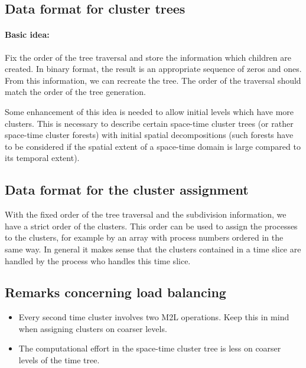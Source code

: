 \documentclass[a4paper,11pt]{article}
\theoremstyle{plain}
\theoremstyle{definition}
\theoremstyle{remark}
\begin{document}
\subsection{Data format for cluster trees}
\paragraph{Basic idea:} Fix the order of the tree traversal and store the information which children are created. In binary format, the result is an appropriate sequence of zeros and ones. From this information, we can recreate the tree. The order of the traversal should match the order of the tree generation.
  
Some enhancement of this idea is needed to allow initial levels which have more clusters. This is necessary to describe certain space-time cluster trees (or rather space-time cluster forests) with initial spatial decompositions (such forests have to be considered if the spatial extent of a space-time domain is large compared to its temporal extent).

\subsection{Data format for the cluster assignment}

With the fixed order of the tree traversal and the subdivision information, we have a strict order of the clusters. This order can be used to assign the processes to the clusters, for example by an array with process numbers ordered in the same way. In general it makes sense that the clusters contained in a time slice are handled by the process who handles this time slice.

\subsection{Remarks concerning load balancing}
\begin{itemize}
  \item Every second time cluster involves two M2L operations. Keep this in mind when assigning clusters on coarser 
  levels.
  \item The computational effort in the space-time cluster tree is less on coarser levels of the time tree.
\end{itemize}
\end{document}
